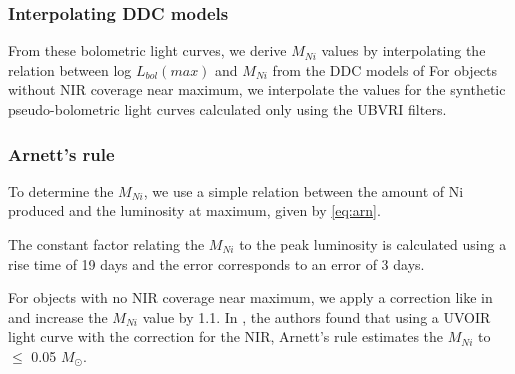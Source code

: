 \subsubsection{Interpolating DDC models}

From these bolometric light curves, we derive $M_{Ni}$ values by interpolating the relation between log $L_{bol}(max)$ and $M_{Ni}$ from the DDC models of \citet{Blondin2013}
For objects without NIR coverage near maximum, we interpolate the values for the synthetic pseudo-bolometric light curves 
calculated only using the UBVRI filters. 


\subsubsection{Arnett's rule}




To determine the $M_{Ni}$, we use a simple relation between the amount of Ni produced and the luminosity at maximum, given by \eqref{eq:arn}.


The constant factor relating the $M_{Ni}$ to the peak luminosity is calculated using a rise time of 19 days and the error corresponds to an error of 3 days.

\fi

For objects with no NIR coverage near maximum, we apply a correction like in \citet{Stritzinger2006} and increase the $M_{Ni}$ value by 1.1. In \citet{Blinnikov2006}, the authors found that using a UVOIR light curve with the correction for the NIR, Arnett's rule estimates the $M_{Ni}$ to $\leq$ 0.05 $M_{\odot}$.

